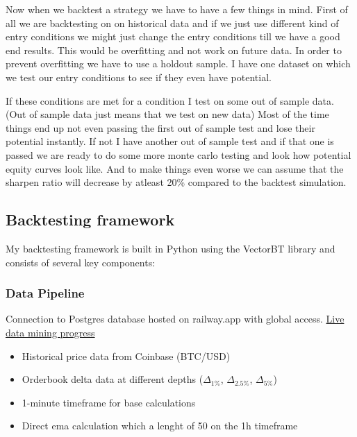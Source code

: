 \documentclass[12pt]{article}
\begin{document}
Now when we backtest a strategy we have to have a few things in mind. First of all we are backtesting on on historical data and if we just use different kind of entry conditions we might just change the entry conditions till we have a good end results. This would be overfitting and not work on future data. 
In order to prevent overfitting we have to use a holdout sample. I have one dataset on which we test our entry conditions to see if they even have potential. 





If these conditions are met for a condition I test on some out of sample data. (Out of sample data just means that we test on new data)
Most of the time things end up not even passing the first out of sample test and lose their potential instantly. If not I have another out of sample test and if that one is passed we are ready to do some more monte carlo testing and look how potential equity curves look like.
And to make things even worse we can assume that the sharpen ratio will decrease by atleast 20\% compared to the backtest simulation.




\newpage


\subsection{Backtesting framework}

My backtesting framework is built in Python using the VectorBT library and consists of several key components:

\subsubsection*{Data Pipeline}

Connection to Postgres database hosted on railway.app with global access. \href{https://customchart-production.up.railway.app/#}{Live data mining progress}
\begin{itemize}
  \item Historical price data from Coinbase (BTC/USD)
  \item Orderbook delta data at different depths ($\Delta_{1\%}$, $\Delta_{2.5\%}$, $\Delta_{5\%}$)
  \item 1-minute timeframe for base calculations
  \item Direct ema calculation which a lenght of 50 on the 1h timeframe
\end{itemize}
\end{document}

